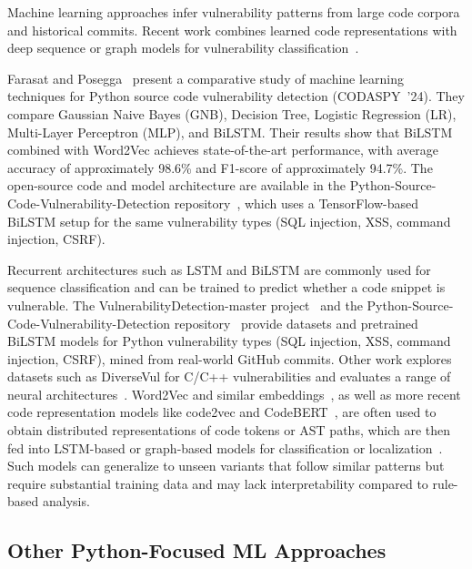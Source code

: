 Machine learning approaches infer vulnerability patterns from large code corpora and historical commits. Recent work combines learned code representations with deep sequence or graph models for vulnerability classification~\cite{Allamanis2018Survey,Alon2019code2vec,Feng2020CodeBERT,Zhou2019Devign,SySeVR2021,Steenhoek2024DeepDFA}.

Farasat and Posegga~\cite{Farasat2024MLPython} present a comparative study of machine learning techniques for Python source code vulnerability detection (CODASPY~'24). They compare Gaussian Naive Bayes (GNB), Decision Tree, Logistic Regression (LR), Multi-Layer Perceptron (MLP), and BiLSTM. Their results show that BiLSTM combined with Word2Vec achieves state-of-the-art performance, with average accuracy of approximately 98.6\% and F1-score of approximately 94.7\%. The open-source code and model architecture are available in the Python-Source-Code-Vulnerability-Detection repository~\cite{PythonVulnDetectionDataset}, which uses a TensorFlow-based BiLSTM setup for the same vulnerability types (SQL injection, XSS, command injection, CSRF).

Recurrent architectures such as LSTM and BiLSTM are commonly used for sequence classification and can be trained to predict whether a code snippet is vulnerable. The VulnerabilityDetection-master project~\cite{VulnDetection} and the Python-Source-Code-Vulnerability-Detection repository~\cite{PythonVulnDetectionDataset} provide datasets and pretrained BiLSTM models for Python vulnerability types (SQL injection, XSS, command injection, CSRF), mined from real-world GitHub commits. Other work explores datasets such as DiverseVul for C/C++ vulnerabilities and evaluates a range of neural architectures~\cite{Fan2023DiverseVul,Zhou2019Devign}. Word2Vec and similar embeddings~\cite{Word2VecRef}, as well as more recent code representation models like code2vec and CodeBERT~\cite{Alon2019code2vec,Feng2020CodeBERT}, are often used to obtain distributed representations of code tokens or AST paths, which are then fed into LSTM-based or graph-based models for classification or localization~\cite{LSTMRef,Li2018VulDeePecker,Zhang2025DLSurvey}. Such models can generalize to unseen variants that follow similar patterns but require substantial training data and may lack interpretability compared to rule-based analysis.

\subsection{Other Python-Focused ML Approaches}
\label{sec:rw_ml_python}

